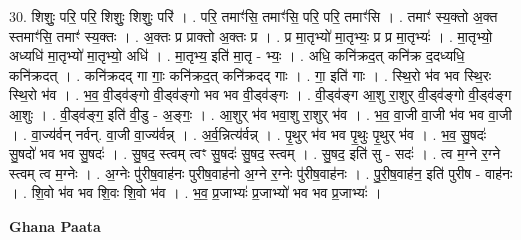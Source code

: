 \documentclass[17pt]{extarticle}
\begin{document}
30. शिशुः॒ परि॒ परि॒ शिशुः॒ शिशुः॒ परि॑ । . परि॒ तमाꣳ॑सि॒ तमाꣳ॑सि॒ परि॒ परि॒ तमाꣳ॑सि । . तमाꣳ॑ स्य॒क्तो अ॒क्त स्तमाꣳ॑सि॒ तमाꣳ॑ स्य॒क्तः । . अ॒क्तः प्र प्राक्तो अ॒क्तः प्र । . प्र मा॒तृभ्यो॑ मा॒तृभ्यः॒ प्र प्र मा॒तृभ्यः॑ । . मा॒तृभ्यो॒ अध्यधि॑ मा॒तृभ्यो॑ मा॒तृभ्यो॒ अधि॑ । . मा॒तृभ्य॒ इति॑ मा॒तृ - भ्यः॒ । . अधि॒ कनि॑क्रद॒त् कनि॑क्र द॒दध्यधि॒ कनि॑क्रदत् । . कनि॑क्रदद् गा गाः॒ कनि॑क्रद॒त् कनि॑क्रदद् गाः । . गा॒ इति॑ गाः । . स्थि॒रो भ॑व भव स्थि॒रः स्थि॒रो भ॑व । . भ॒व॒ वी॒ड्व॑ङ्गो वी॒ड्व॑ङ्गो भव भव वी॒ड्व॑ङ्गः । . वी॒ड्व॑ङ्ग आ॒शु रा॒शुर् वी॒ड्व॑ङ्गो वी॒ड्व॑ङ्ग आ॒शुः । . वी॒ड्व॑ङ्ग॒ इति॑ वी॒डु - अ॒ङ्गः॒ । . आ॒शुर् भ॑व भवा॒शु रा॒शुर् भ॑व । . भ॒व॒ वा॒जी वा॒जी भ॑व भव वा॒जी । . वा॒ज्य॑र्वन् नर्वन्. वा॒जी वा॒ज्य॑र्वन्न् । . अ॒र्व॒न्नित्य॑र्वन्न् । . पृ॒थुर् भ॑व भव पृ॒थुः पृ॒थुर् भ॑व । . भ॒व॒ सु॒षदः॑ सु॒षदो॑ भव भव सु॒षदः॑ । . सु॒षद॒ स्त्वम् त्वꣳ सु॒षदः॑ सु॒षद॒ स्त्वम् । . सु॒षद॒ इति॑ सु - सदः॑ । . त्व म॒ग्ने र॒ग्ने स्त्वम् त्व म॒ग्नेः । . अ॒ग्नेः पु॑रीष॒वाह॑नः पुरीष॒वाह॑नो अ॒ग्ने र॒ग्नेः पु॑रीष॒वाह॑नः । . पु॒री॒ष॒वाह॑न॒ इति॑ पुरीष - वाह॑नः । . शि॒वो भ॑व भव शि॒वः शि॒वो भ॑व । . भ॒व॒ प्र॒जाभ्यः॑ प्र॒जाभ्यो॑ भव भव प्र॒जाभ्यः॑ । \newline

\textbf{Ghana Paata } \newline
\end{document}
